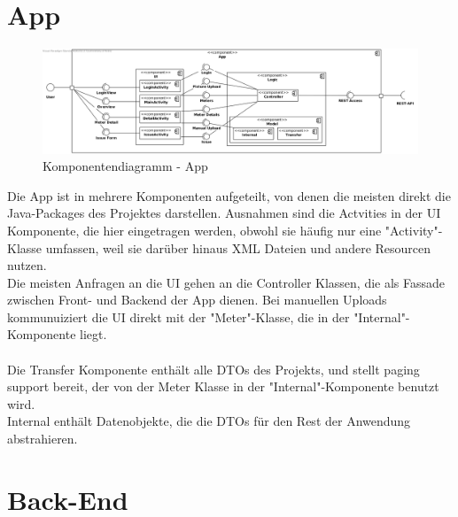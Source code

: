\section{App}
\begin{figure}[h]
\includegraphics[scale=0.45]{img/diagrams/AppComponentDiagram}\caption{Komponentendiagramm - App}  
\end{figure} 
Die App ist in mehrere Komponenten aufgeteilt, von denen die meisten direkt die Java-Packages des Projektes darstellen. Ausnahmen sind die Actvities in der UI Komponente, die hier eingetragen werden, obwohl sie häufig nur eine "Activity"-Klasse umfassen, weil sie darüber hinaus XML Dateien und andere Resourcen nutzen.\\
Die meisten Anfragen an die UI gehen an die Controller Klassen, die als Fassade zwischen Front- und Backend der App dienen. Bei manuellen Uploads kommunuiziert die UI direkt mit der "Meter"-Klasse, die in der "Internal"-Komponente liegt.\\ \\
Die Transfer Komponente enthält alle DTOs des Projekts, und stellt paging support bereit, der von der Meter Klasse in der "Internal"-Komponente benutzt wird.\\
Internal enthält Datenobjekte, die die DTOs für den Rest der Anwendung abstrahieren.
\section{Back-End}

